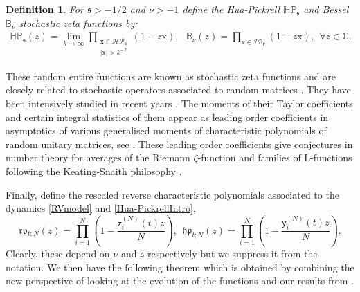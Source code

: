 \documentclass[]{article}
\newtheorem{defn}[thm]{Definition}
\begin{document}
\begin{defn}
For $\mathfrak{s}>-1/2$ and $\nu>-1$ define the Hua-Pickrell $\mathbb{HP}_\mathfrak{s}$ and Bessel $\mathbb{B}_\nu$ stochastic zeta functions by:
\begin{align*}
    \mathbb{HP}_\mathfrak{s}(z)=\lim_{k\to \infty}\prod_{\substack{\mathrm{x}\in \mathcal{HP}_\mathfrak{s}\\|\mathrm{x}|>k^{-2}}}\left(1-z\mathrm{x}\right), \ \  \
    \mathbb{B}_{\nu}(z)=\prod_{\mathrm{x}\in \mathcal{IB}_{\nu}}(1-z\mathrm{x}), \ \ \forall z \in \mathbb{C}.
\end{align*}
\end{defn}
These random entire functions are known as stochastic zeta functions \cite{ChhaibiNajnudelNikeghbali,ValkoVirag2} and are closely related to stochastic operators associated to random matrices \cite{RamirezRiderVirag,RamirezRider,ValkoVirag1}. They have been intensively studied in recent years \cite{ChhaibiNajnudelNikeghbali,ValkoVirag2,LiValko,LambertPaquette1,LambertPaquette2,NajnudelNikeghbali,Theo-RandomEntireFunctions}. The moments of their Taylor coefficients and certain integral statistics of them appear as leading order coefficients in asymptotics of various generalised moments of characteristic polynomials of random unitary matrices, see \cite{AGKW1,AGKW2,AssiotisNajnudel}. These leading order coefficients give conjectures in number theory for averages of the Riemann $\zeta$-function and families of L-functions following the Keating-Snaith philosophy \cite{KeatingSnaith1,KeatingSnaith2,BaileyKeating}.

Finally, define the rescaled reverse characteristic polynomials associated to the dynamics \eqref{RVmodel} and \eqref{Hua-PickrellIntro},
\begin{equation*}
\mathfrak{rv}_{t;N}(z)=\prod_{i=1}^N\left(1-\frac{\mathsf{z}_i^{(N)}(t)z}{N}\right), \ \ \mathfrak{hp}_{t;N}(z)=\prod_{i=1}^N\left(1-\frac{\mathsf{y}_i^{(N)}(t)z}{N}\right).
\end{equation*}
Clearly, these depend on $\nu$ and $\mathfrak{s}$ respectively but we suppress it from the notation. We then have the following theorem which is obtained by combining the new perspective of looking at the evolution of the functions and our results from \cite{AM24}. 
\end{document}

